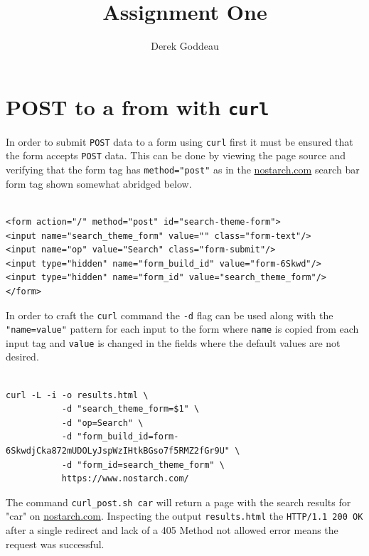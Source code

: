 \documentclass[12pt, a4paper]{article}
\author{Derek Goddeau}
\title{Assignment One}
\newcommand{\code}[1]{\texttt{#1}}
\begin{document}
\maketitle

\newpage

\section{POST to a from with \code{curl}}

In order to submit \code{POST} data to a form using \code{curl} first
it must be ensured that the form accepts \code{POST} data. This can be
done by viewing the page source and verifying that the form tag has
\code{method="post"} as in the \href{https://nostarch.com}{nostarch.com}
search bar form tag shown somewhat abridged below.

\begin{verbatim}

<form action="/" method="post" id="search-theme-form">
<input name="search_theme_form" value="" class="form-text"/>
<input name="op" value="Search" class="form-submit"/>
<input type="hidden" name="form_build_id" value="form-6Skwd"/>
<input type="hidden" name="form_id" value="search_theme_form"/>
</form>
\end{verbatim}

\noindent
In order to
craft the \code{curl} command the \code{-d} flag can be used along
with the \code{"name=value"} pattern for each input to the form
where \code{name} is copied from each input tag and \code{value}
is changed in the fields where the default values are not desired.

\begin{minipage}{\linewidth} %
\vspace{2em}
\begin{verbatim}

curl -L -i -o results.html \
           -d "search_theme_form=$1" \
           -d "op=Search" \
           -d "form_build_id=form-6SkwdjCka872mUDOLyJspWzIHtkBGso7f5RMZ2fGr9U" \
           -d "form_id=search_theme_form" \
           https://www.nostarch.com/
\end{verbatim}
\vspace{2em}
\end{minipage}

\noindent
The command \code{curl\_post.sh car} will return
a page with the search results for "car" on \href{https://nostarch.com}
{nostarch.com}. Inspecting the output \code{results.html} the
\code{HTTP/1.1 200 OK} after a single redirect and lack of a 405
Method not allowed error means the request was successful.
\end{document}
